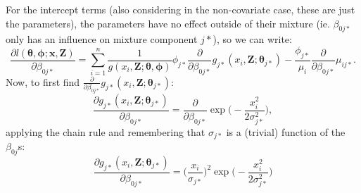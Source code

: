 \documentclass{report}
\begin{document}
For the intercept terms (also considering in the non-covariate case, these are just the parameters), the parameters have no effect outside of their mixture (ie. $\beta_{0j*}$ only has an influence on mixture component $j*$), so we can write:
\begin{equation*}
\frac{\partial l(\bm{\theta},\bm{\phi}; \mathbf{x},\mathbf{Z})}{\partial \beta_{0j*}} = \sum_{i=1}^n \frac{1}{g(x_i,\mathbf{Z}; \bm{\theta},\bm{\phi})} \phi_{j*} \frac{\partial}{\partial \beta_{0j*}} g_{j*}(x_i,\mathbf{Z}; \bm{\theta}_{j*})  - \frac{\phi_{j*}}{\mu_i}  \frac{\partial}{\partial \beta_{0j*}} \mu_{ij*}.
\end{equation*}
Now, to first find $\frac{\partial}{\partial \beta_{0j*}} g_{j*}(x_i,\mathbf{Z}; \bm{\theta}_{j*})$:
\begin{equation*}
\frac{\partial g_{j*}(x_i,\mathbf{Z}; \bm{\theta}_{j*})}{\partial \beta_{0j*}} = \frac{\partial}{\partial \beta_{0j*}} \exp\Big( -\frac{x_i^2}{2\sigma_{j*}^2} \Big),
\end{equation*}
applying the chain rule and remembering that $\sigma_{j*}$ is a (trivial) function of the $\beta_{0j}$s:
\begin{equation*}
\frac{\partial g_{j*}(x_i,\mathbf{Z}; \bm{\theta}_{j*})}{\partial \beta_{0j*}} = \Big( \frac{x_i}{\sigma_{j*}}\Big)^2 \exp \Big(-\frac{x_i^2}{2 \sigma_{j*}^2}\Big)
\end{equation*}
\end{document}
